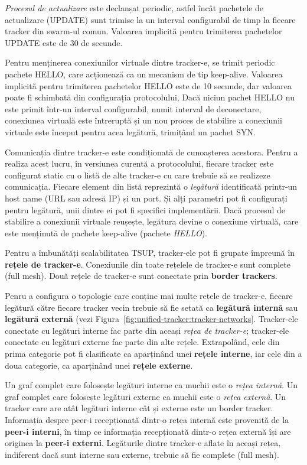 \textit{Procesul de actualizare} este declanșat periodic, astfel încât pachetele de actualizare (UPDATE) sunt trimise la un interval configurabil de timp la fiecare tracker din swarm-ul comun. Valoarea implicită pentru trimiterea pachetelor UPDATE este de 30 de secunde.

Pentru menținerea conexiunilor virtuale dintre tracker-e, se trimit periodic pachete HELLO, care acționează ca un mecanism de tip keep-alive. Valoarea implicită pentru trimiterea pachetelor HELLO este de 10 secunde, dar valoarea poate fi schimbată din configurația protocolului, Dacă niciun pachet HELLO nu este primit într-un interval configurabil, numit interval de deconectare, conexiunea virtuală este întreruptă și un nou proces de stabilire a conexiunii virtuale este început pentru acea legătură, trimițând un pachet SYN.

Comunicația dintre tracker-e este condiționată de cunoașterea acestora. Pentru a realiza acest lucru, în versiunea curentă a protocolului, fiecare tracker este configurat static cu o listă de alte tracker-e cu care trebuie să se realizeze comunicația. Fiecare element din listă reprezintă o \textit{legătură} identificată printr-un host name (URL sau adresă IP) și un port. Și alți parametri pot fi configurați pentru legătură, unii dintre ei pot fi specifici implementării. Dacă procesul de stabilire a conexiunii virtuale reușește, legătura devine o conexiune virtuală, care este menținută de pachete keep-alive (pachete \textit{HELLO}).

Pentru a îmbunătăți scalabilitatea TSUP, tracker-ele pot fi grupate împreună în \textbf{rețele de tracker-e}. Conexiunile din toate rețelele de tracker-e sunt complete (full mesh). Două rețele de tracker-e sunt conectate prin \textbf{border trackers}.

Penru a configura o topologie care conține mai multe rețele de tracker-e, fiecare legătură către fiecare tracker vecin trebuie să fie setată ca \textbf{legătură internă} sau \textbf{legătură externă} (vezi Figura~\ref{fig:unified-tracker:tracker-networks}. Tracker-ele conectate cu legături interne fac parte din aceași \textit{rețea de tracker-e}; tracker-ele conectate cu legături externe fac parte din alte rețele. Extrapolând, cele din prima categorie pot fi clasificate ca aparținând unei \textbf{rețele interne}, iar cele din a doua categorie, ca aparținând  unei \textbf{rețele externe}.

Un graf complet care folosește legături interne ca muchii este o \textit{rețea internă}. Un graf complet care folosește legături externe ca muchii este o \textit{rețea externă}. Un tracker care are atât legături interne cât și externe este un border tracker. Informația despre peer-i recepționată dintr-o rețea internă este provenită de la \textbf{peer-i interni}, în timp ce informația recepționată dintr-o rețea externă își are originea la \textbf{peer-i externi}.  Legăturile dintre tracker-e aflate în aceași rețea, indiferent dacă sunt interne sau externe, trebuie să fie complete (full mesh).


